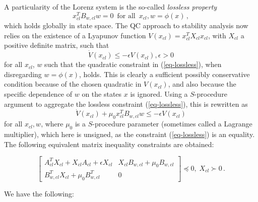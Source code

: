 \documentclass[12pt, a4paper,reqno]{amsart}
\theoremstyle{definition}
\begin{document}
A particularity of the Lorenz system is the so-called {\em lossless property}
\begin{equation}
\label{eq-lossless}
x_{cl}^T B_{w,cl} w = 0 \, \mbox{ for all }\,  x_{cl},  w = \phi(x) \,,
\end{equation}
which holds globally in  state space. 
%
The QC approach to stability analysis now relies on the existence of a Lyapunov function $V(x_{cl}) = x_{cl}^T X_{cl} x_{cl}$, with $X_{cl}$ a positive definite matrix, such that 
$$\dot V(x_{cl}) \leq -\epsilon V(x_{cl}), \epsilon > 0$$ for all $x_{cl}$, $w$ such that the quadratic constraint in  (\ref{eq-lossless}), when disregarding $w = \phi(x)$, holds. This is clearly a sufficient possibly conservative condition because of the chosen quadratic in $V(x_{cl})$, and also because the specific dependence of $w$ on the states $x$ is ignored.  Using a $S$-procedure argument \cite{kalur2021nonlinear,boyd1994linear} to aggregate the lossless constraint (\ref{eq-lossless}),  this is rewritten as 
$$\dot V(x_{cl}) + \mu_0 x_{cl}^T B_{w,cl} w \leq -\epsilon V(x_{cl})$$ for all $x_{cl}, w$, where $\mu_0$ is a $S$-procedure parameter (sometimes called a Lagrange multiplier), which here is unsigned, as the constraint (\ref{eq-lossless}) is an equality.  The following equivalent  matrix inequality constraints are obtained:   

\begin{equation}
\label{eq-LMI}
\begin{bmatrix}
    A_{cl}^T X_{cl} + X_{cl}  A_{cl} + \epsilon X_{cl} & X_{cl} B_{w,cl} + \mu_0  B_{w,cl}  \\
    B_{w,cl}^T X_{cl} +  \mu_0  B_{w,cl}^T & 0
\end{bmatrix} \preceq 0, \; X_{cl} \succ 0 \,.
\end{equation}


We have the following:
\end{document}
